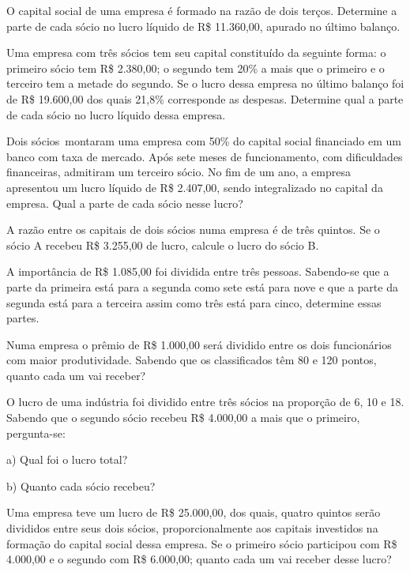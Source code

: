 \begin{exercicios}

	\exitem{} O capital social de uma empresa é formado na razão de dois terços. Determine a parte de cada sócio no lucro líquido de R\$ 11.360,00, apurado no último balanço.

	\exitem{} Uma empresa com três sócios tem seu capital constituído da seguinte forma: o primeiro sócio tem R\$  2.380,00; o segundo tem 20\% a mais que o primeiro e o terceiro tem a metade do segundo. Se o lucro dessa empresa no último balanço foi de  R\$ 19.600,00 dos quais 21,8\%  corresponde as despesas. Determine qual a parte de cada sócio no lucro líquido dessa empresa.

	\exitem{} Dois sócios\  montaram uma empresa com 50\%  do capital social financiado em um banco com taxa de mercado. Após sete meses de funcionamento, com dificuldades financeiras, admitiram um terceiro sócio. No fim de um ano, a empresa apresentou um lucro líquido de R\$  2.407,00, sendo integralizado no capital da empresa. Qual a parte de cada sócio nesse lucro? 

	\exitem{} A razão entre os capitais de dois sócios numa empresa é de três quintos. Se o sócio A recebeu R\$ 3.255,00 de lucro, calcule o lucro do sócio B.

	\exitem{} A importância de R\$  1.085,00 foi dividida entre três pessoas. Sabendo-se que a parte da primeira está para a segunda como sete está para nove e que a parte da segunda está para a terceira assim como três está para cinco, determine essas partes.

	\exitem{} Numa empresa o prêmio de R\$  1.000,00 será dividido entre os dois funcionários com maior produtividade. Sabendo que os classificados têm 80 e 120 pontos, quanto cada um vai receber?

	\exitem{} O lucro de uma indústria foi dividido entre três sócios na proporção de 6, 10 e 18. Sabendo que o segundo sócio recebeu R\$  4.000,00 a mais que o primeiro, pergunta-se: 

	a) Qual foi o lucro total? 

	b) Quanto cada sócio recebeu?

	\exitem{}  Uma empresa teve um lucro de R\$  25.000,00, dos quais, quatro quintos serão divididos entre seus dois sócios, proporcionalmente aos capitais investidos na formação do capital social dessa empresa. Se o primeiro sócio participou com R\$  4.000,00 e o segundo com R\$  6.000,00; quanto cada um vai receber desse lucro?


\end{exercicios}
